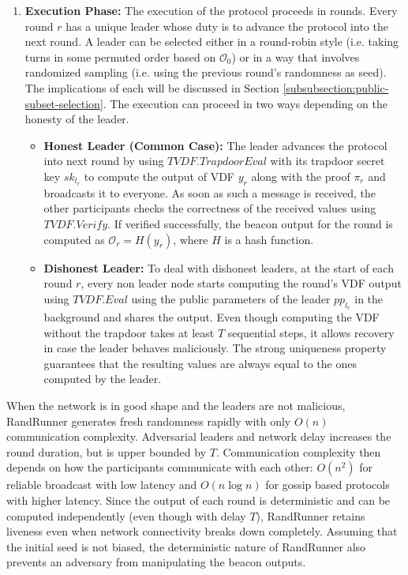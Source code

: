 \documentclass[letterpaper,twocolumn,10pt]{article}
\theoremstyle{definition}
\theoremstyle{remark}
\begin{document}
\begin{enumerate}
\item \textbf{Execution Phase:} The execution of the protocol proceeds in rounds. Every round $r$ has a unique leader whose duty is to advance the protocol into the next round. A leader can be selected either in a round-robin style (i.e. taking turns in some permuted order based on $\mathcal{O}_0$) or in a way that involves randomized sampling (i.e. using the previous round’s randomness as seed). The implications of each will be discussed in Section \ref{subsubsection:public-subset-selection}. The execution can proceed in two ways depending on the honesty of the leader.
\begin{itemize}
    \item \textbf{Honest Leader (Common Case):} The leader advances the protocol into next round by using $TVDF.TrapdoorEval$ with its trapdoor secret key $sk_{l_r}$ to compute the output of VDF $y_r$ along with the proof $\pi_r$ and broadcasts it to everyone. As soon as such a message is received, the other participants checks the correctness of the received values using $TVDF.Verify$. If verified successfully, the beacon output for the round is computed as $\mathcal{O}_r = H(y_r)$, where $H$ is a hash function.
    \item \textbf{Dishonest Leader:} To deal with dishonest leaders, at the start of each round $r$, every non leader node starts computing the round’s VDF
    output using $TVDF.Eval$ using the public parameters of the leader $pp_{l_r}$ in the background and shares the output. Even though computing the VDF without the trapdoor takes at least $T$ sequential steps, it allows recovery in case the leader behaves maliciously. The strong uniqueness property guarantees that the resulting values are always equal to the ones computed by the leader.
\end{itemize}
\end{enumerate}

When the network is in good shape and the leaders are not malicious, RandRunner generates fresh randomness rapidly with only $O(n)$ communication complexity. Adversarial leaders and network delay increases the round duration, but is upper bounded by $T$. Communication complexity then depends on how the participants communicate with each other: $O(n^2)$ for reliable broadcast with low latency and $O(n \log n)$ for gossip based protocols with higher latency. Since the output of each round is deterministic and can be computed independently (even though with delay $T$), RandRunner retains liveness even when network connectivity breaks down completely. Assuming that the initial seed is not biased, the deterministic nature of RandRunner also prevents an adversary from manipulating the beacon outputs. 
\end{document}
